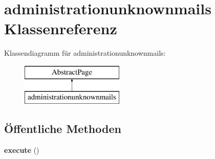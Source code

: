 \hypertarget{classadministrationunknownmails}{}\section{administrationunknownmails Klassenreferenz}
\label{classadministrationunknownmails}
Klassendiagramm für administrationunknownmails\+:\begin{figure}[H]
\begin{center}
\leavevmode
\includegraphics[height=2.000000cm]{classadministrationunknownmails}
\end{center}
\end{figure}
\subsection*{Öffentliche Methoden}
\begin{DoxyCompactItemize}
\item 
\mbox{\label{classadministrationunknownmails_a7680adc1cea3b4943cc93327d6c6c82c}} 
{\bfseries execute} ()
\end{DoxyCompactItemize}
